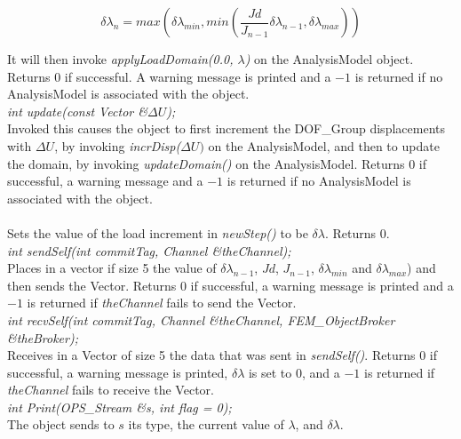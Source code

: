\[ 
\delta \lambda_n = max \left( \delta \lambda_{min}, min \left(
\frac{Jd}{J_{n-1}} \delta \lambda_{n-1}, \delta \lambda_{max} \right) \right)
\]

\noindent It will then invoke
{\em applyLoadDomain(0.0, $\lambda$)} on the AnalysisModel
object. Returns $0$ if successful. A warning message is printed and a
$-1$ is returned if no AnalysisModel is associated with the object. \\

{\em int update(const Vector \&$\Delta U$);} \\
Invoked this causes the object to first increment the DOF\_Group
displacements with $\Delta U$, by invoking {\em incrDisp($\Delta U)$}
on the AnalysisModel, and then to update the domain, by invoking {\em
updateDomain()} on the AnalysisModel. Returns $0$ if successful, a
warning message and a $-1$ is returned if no AnalysisModel is
associated with the object. \\


 \\
Sets the value of the load increment in {\em newStep()} to be $\delta
\lambda$. Returns $0$.\\

{\em int sendSelf(int commitTag, Channel \&theChannel); } \\ 
Places in a vector if size 5 the value of $\delta \lambda_{n-1}$,
$Jd$, $J_{n-1}$, $\delta \lambda_{min}$ and $\delta \lambda_{max}$)
and then sends the Vector. Returns $0$ if successful, a warning
message is printed and a $-1$ is returned if {\em theChannel} fails to
send the Vector. \\ 

{\em int recvSelf(int commitTag, Channel \&theChannel, 
FEM\_ObjectBroker \&theBroker); } \\ 
Receives in a Vector of size 5 the data that was sent in {\em sendSelf()}.
Returns $0$ if successful, a warning message is printed, $\delta
\lambda$ is set to $0$, and a $-1$ is returned if {\em theChannel} 
fails to receive the Vector.\\

{\em int Print(OPS_Stream \&s, int flag = 0);}\\
The object sends to $s$ its type, the current value of $\lambda$, and
$\delta \lambda$. 